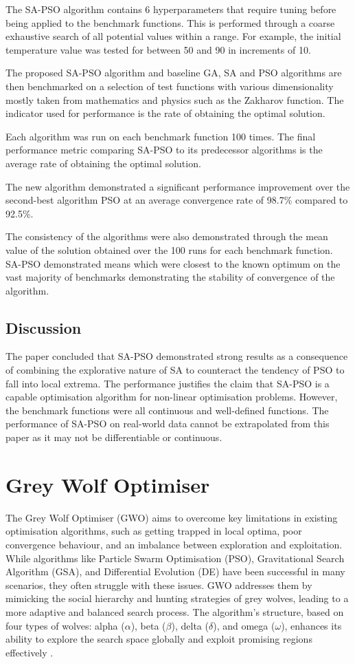 \documentclass[a4paper, 12pt]{extarticle}
\begin{document}
The SA-PSO algorithm contains 6 hyperparameters that require tuning before being applied to the benchmark functions. This is performed through a coarse exhaustive search of all potential values within a range. For example, the initial temperature value was tested for between 50 and 90 in increments of 10.

The proposed SA-PSO algorithm and baseline GA, SA and PSO algorithms are then benchmarked on a selection of test functions with various dimensionality mostly taken from mathematics and physics such as the Zakharov function. The indicator used for performance is the rate of obtaining the optimal solution.

Each algorithm was run on each benchmark function 100 times. The final performance metric comparing SA-PSO to its predecessor algorithms is the average rate of obtaining the optimal solution.

The new algorithm demonstrated a significant performance improvement over the second-best algorithm PSO at an average convergence rate of 98.7\% compared to 92.5\%.

The consistency of the algorithms were also demonstrated through the mean value of the solution obtained over the 100 runs for each benchmark function. SA-PSO demonstrated means which were closest to the known optimum on the vast majority of benchmarks demonstrating the stability of convergence of the algorithm.

\subsection{Discussion}

The paper concluded that SA-PSO demonstrated strong results as a consequence of combining the explorative nature of SA to counteract the tendency of PSO to fall into local extrema. The performance justifies the claim that SA-PSO is a capable optimisation algorithm for non-linear optimisation problems. 
However, the benchmark functions were all continuous and well-defined functions. The performance of SA-PSO on real-world data cannot be extrapolated from this paper as it may not be differentiable or continuous.

\newpage
\section{Grey Wolf Optimiser}
The Grey Wolf Optimiser (GWO) aims to overcome key limitations in existing optimisation algorithms, such as getting trapped in local optima, poor convergence behaviour, and an imbalance between exploration and exploitation. While algorithms like Particle Swarm Optimisation (PSO), Gravitational Search Algorithm (GSA), and Differential Evolution (DE) have been successful in many scenarios, they often struggle with these issues. GWO addresses them by mimicking the social hierarchy and hunting strategies of grey wolves, leading to a more adaptive and balanced search process. The algorithm's structure, based on four types of wolves: alpha ($\alpha$), beta ($\beta$), delta ($\delta$), and omega ($\omega$), enhances its ability to explore the search space globally and exploit promising regions effectively \cite{mirjalili2014grey}.
\end{document}
